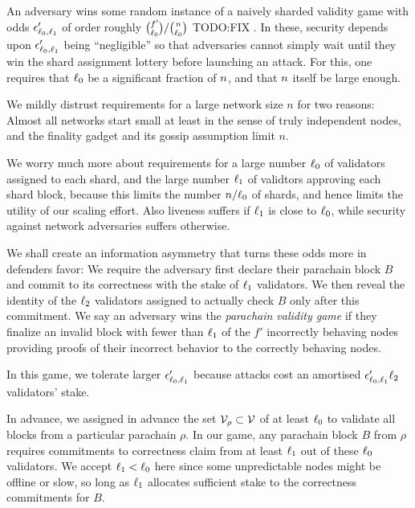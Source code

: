 An adversary wins some random instance of a naively sharded validity game with odds $\epsilon'_{\ell_0,\ell_1}$ of order roughly ${f' \choose \ell_0} / {n \choose \ell_0}$ TODO:FIX \cite{??}.  
In these, security depends upon $\epsilon'_{\ell_0,\ell_1}$ being ``negligible'' so that adversaries cannot simply wait until they win the shard assignment lottery before launching an attack.  For this, one requires that $\ell_0$ be a significant fraction of $n$, and that $n$ itself be large enough. 


We mildly distrust requirements for a large network size $n$ for two reasons: Almost all networks start small at least in the sense of truly independent nodes, and the finality gadget and its gossip assumption limit $n$.  

We worry much more about requirements for a large number $\ell_0$ of validators assigned to each shard, and the large number $\ell_1$ of validtors approving each shard block, because this limits the number $n/\ell_0$ of shards, and hence limits the utility of our scaling effort.  Also liveness suffers if $\ell_1$ is close to $\ell_0$, while security against network adversaries suffers otherwise.

We shall create an information asymmetry that turns these odds more in defenders favor: 
We require the adversary first declare their parachain block $B$ and commit to its correctness with the stake of $\ell_1$ validators.  We then reveal the identity of the $\ell_2$ validators assigned to actually check $B$ only after this commitment.  We say an adversary wins the {\em parachain validity game} if they finalize an invalid block with fewer than $\ell_1$ of the $f'$ incorrectly behaving nodes providing proofs of their incorrect behavior to the correctly behaving nodes. 

In this game, we tolerate larger $\epsilon'_{\ell_0,\ell_1}$ because attacks cost an amortised $\epsilon'_{\ell_0,\ell_1} \ell_2$ validators' stake. 


In advance, we assigned in advance the set $\mathcal{V}_{\rho} \subset \mathcal{V}$ of at least $\ell_0$ to validate all blocks from a particular parachain $\rho$.  
In our game, any parachain block $B$ from $\rho$ requires commitments to correctness claim from at least $\ell_1$ out of these $\ell_0$ validators.  We accept $\ell_1 < \ell_0$ here since some unpredictable nodes might be offline or slow, so long as $\ell_1$ allocates sufficient stake to the correctness commitments for $B$.  

